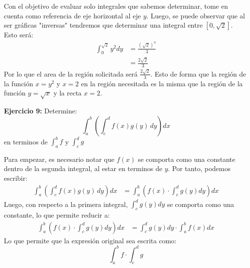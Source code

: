 \documentclass[../../main.tex]{subfiles}
\begin{document}
\begin{partes}
\begin{figure}[h]
    \end{figure}
    Con el objetivo de evaluar solo integrales que sabemos determinar, tome en cuenta como referencia de eje horizontal al eje $y$.
    Luego, se puede observar que al ser gráficas "inversas" tendremos que determinar una integral entre $[0, \sqrt{2}]$. Esto será:
    \begin{align*}
        \int_{0}^{\sqrt{2}} y^2 dy &= \frac{(\sqrt{2})^3}{3}\\
        &= \frac{2\sqrt{2}}{3}
    \end{align*}
    Por lo que el area de la región solicitada será $\frac{2\sqrt{2}}{3}$. Esto de forma que la región de la función $x = y^2$ y $x=2$ en la región necesitada es
    la misma que la región de la función $y = \sqrt{x}$ y la recta $x=2$.
\end{partes}

\question \textbf{Ejercicio 9:} Determine: $$\int_{a}^b \left(\int_{c}^d f(x) g(y)\, dy\right) dx$$ en terminos de $\int_{a}^b f$ y $\int_{c}^d g$

Para empezar, es necesario notar que $f(x)$ se comporta como una constante dentro de la segunda integral, al estar en terminos de $y$. Por tanto, podemos escribir:
\begin{align*}
    \int_{a}^b \left(\int_{c}^d f(x) g(y)\, dy\right) dx &= \int_{a}^b \left(f(x) \cdot \int_{c}^d g(y) dy\right)dx
\end{align*}
Luego, con respecto a la primera integral, $\int_{c}^d g(y) dy$ se comporta como una constante, lo que permite reducir a:
\begin{align*}
    \int_{a}^b \left(f(x) \cdot \int_{c}^d g(y) dy\right)dx &= \int_{c}^d g(y) dy \cdot \int_{a}^b f(x) dx
\end{align*}
Lo que permite que la expresión original sea escrita como:
$$\int_a^b f \cdot \int_c^d g$$
\end{document}
